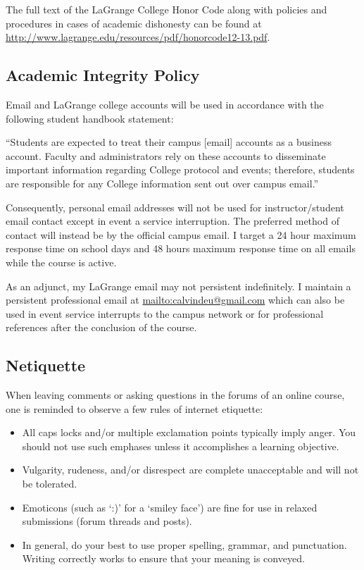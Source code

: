 \documentclass[11pt]{article}
\begin{document}
The full text of the LaGrange College Honor Code along with policies and procedures in cases of academic
dishonesty can be found at \url{http://www.lagrange.edu/resources/pdf/honorcode12-13.pdf}.

\subsection*{Academic Integrity Policy}

Email and LaGrange college accounts will be used in accordance with the following student handbook
statement:

\begin{displayquote}
“Students are expected to treat their campus [e­mail] accounts as a business account.
Faculty and administrators rely on these accounts to disseminate important information regarding
College protocol and events; therefore, students are responsible for any College information sent
out over campus e­mail.”
\end{displayquote}

Consequently, personal email addresses will not be used for instructor/student email contact except in event a service interruption. The preferred
method of contact will instead be by the official campus email. I target a 24 hour maximum response time on school days and 48 hours maximum response time on all emails while the course is active.

\skip

As an adjunct, my LaGrange email may not persistent indefinitely. I maintain a persistent professional email at \href{calvindeu@gmail.com}{mailto:calvindeu@gmail.com} which can also be used in event service interrupts to the campus network or for professional references after the conclusion of the course.

\subsection*{Netiquette}

When leaving comments or asking questions in the forums of an online course, one is reminded to observe
a few rules of internet etiquette:

\begin{itemize}
\item All caps locks and/or multiple exclamation points typically imply anger. You should not use such
emphases unless it accomplishes a learning objective.
\item Vulgarity, rudeness, and/or disrespect are complete unacceptable and will not be tolerated.
\item Emoticons (such as ‘:)’ for a ‘smiley face’) are fine for use in relaxed submissions (forum threads
and posts).
\item In general, do your best to use proper spelling, grammar, and punctuation. Writing correctly
works to ensure that your meaning is conveyed.
\end{itemize}
\end{document}
